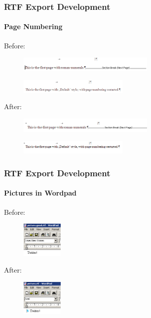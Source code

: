 \documentclass[hyperref={pdfpagelabels=false}]{beamer}
\begin{document}
\begin{frame}
\frametitle{RTF Export Development}
\framesubtitle{Page Numbering}
Before:
\begin{figure}[H]
\includegraphics[width=250px,keepaspectratio]{pic/pagenum-restart-old1.png}
\end{figure}
\begin{figure}[H]
\includegraphics[width=200px,keepaspectratio]{pic/pagenum-restart-old2.png}
\end{figure}
After:
\begin{figure}[H]
\includegraphics[width=250px,keepaspectratio]{pic/pagenum-restart-new1.png}
\end{figure}
\begin{figure}[H]
\includegraphics[width=200px,keepaspectratio]{pic/pagenum-restart-new2.png}
\end{figure}
\end{frame}

\begin{frame}
\frametitle{RTF Export Development}
\framesubtitle{Pictures in Wordpad}
Before:
\begin{figure}[H]
\includegraphics[width=75px,keepaspectratio]{pic/picture-wp-old.png}
\end{figure}
After:
\begin{figure}[H]
\includegraphics[width=75px,keepaspectratio]{pic/picture-wp-new.png}
\end{figure}
\end{frame}
\end{document}
